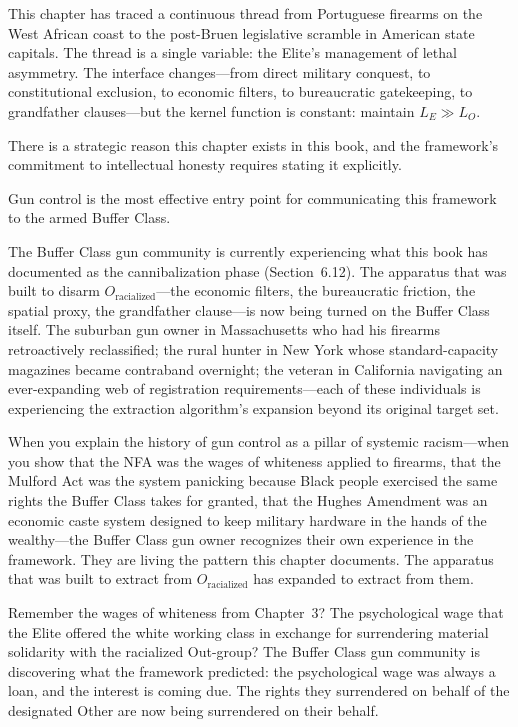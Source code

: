 \documentclass[12pt,openany]{book}
\begin{document}
This chapter has traced a continuous thread from Portuguese firearms on the West African coast to the post-Bruen legislative scramble in American state capitals. The thread is a single variable: the Elite's management of lethal asymmetry. The interface changes---from direct military conquest, to constitutional exclusion, to economic filters, to bureaucratic gatekeeping, to grandfather clauses---but the kernel function is constant: maintain $L_E \gg L_O$.

There is a strategic reason this chapter exists in this book, and the framework's commitment to intellectual honesty requires stating it explicitly.

Gun control is the most effective entry point for communicating this framework to the armed Buffer Class.

The Buffer Class gun community is currently experiencing what this book has documented as the cannibalization phase (Section~6.12). The apparatus that was built to disarm $O_{\text{racialized}}$---the economic filters, the bureaucratic friction, the spatial proxy, the grandfather clause---is now being turned on the Buffer Class itself. The suburban gun owner in Massachusetts who had his firearms retroactively reclassified; the rural hunter in New York whose standard-capacity magazines became contraband overnight; the veteran in California navigating an ever-expanding web of registration requirements---each of these individuals is experiencing the extraction algorithm's expansion beyond its original target set.

When you explain the history of gun control as a pillar of systemic racism---when you show that the NFA was the wages of whiteness applied to firearms, that the Mulford Act was the system panicking because Black people exercised the same rights the Buffer Class takes for granted, that the Hughes Amendment was an economic caste system designed to keep military hardware in the hands of the wealthy---the Buffer Class gun owner recognizes their own experience in the framework. They are living the pattern this chapter documents. The apparatus that was built to extract from $O_{\text{racialized}}$ has expanded to extract from them.

Remember the wages of whiteness from Chapter~3? The psychological wage that the Elite offered the white working class in exchange for surrendering material solidarity with the racialized Out-group? The Buffer Class gun community is discovering what the framework predicted: the psychological wage was always a loan, and the interest is coming due. The rights they surrendered on behalf of the designated Other are now being surrendered on their behalf.
\end{document}
